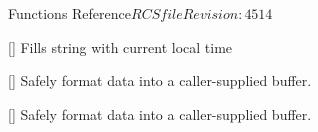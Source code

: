 \begin{cactuspart}{ Functions Reference}{$RCSfile$}{$Revision: 4514 $}
\begin{Lentry}
\item[\code{Util\_CurrentTime}] [\pageref{Util-CurrentTime}]
  Fills string with current local time

\item[\code{Util\_snprintf}]
     [\pageref{Util-snprintf}]
Safely format data into a caller-supplied buffer.

\item[\code{Util\_vsnprintf}]
     [\pageref{Util-vsnprintf}]
Safely format data into a caller-supplied buffer.















\end{Lentry}
\end{cactuspart}
